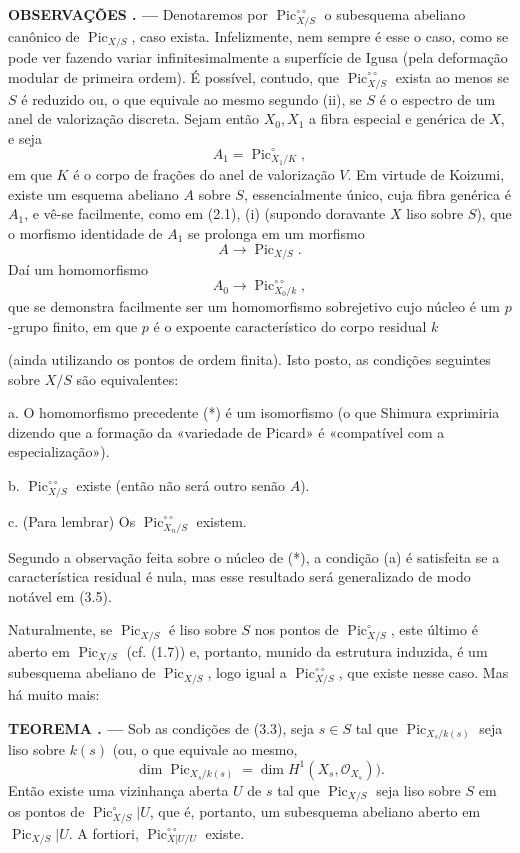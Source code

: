 \documentclass[11pt,twoside,openany]{book}
\numberwithin{equation}{section}
\newcommand{\src}[1]{%
  \phantomsection\hypertarget{src:#1}{}%
  \marginpar{\raggedleft\footnotesize\sffamily #1}%
}
\theoremstyle{plain}
\theoremstyle{definition}
\theoremstyle{remark}
\newcommand{\result}[2]{%
  \par\medskip\noindent\textbf{#1%
  \if\relax\detokenize{#2}\relax\else\space#2\fi. ---}\enspace
}
\newcommand{\FgaUnitKey}{frontmatter}
\renewcommand{\src}[1]{%
  \phantomsection\hypertarget{src:\FgaUnitKey:#1}{}%
  \marginpar{\raggedleft\footnotesize\sffamily #1}%
}
\begin{document}
\result{OBSERVAÇÕES}{3.4} Denotaremos por
$\operatorname{Pic}_{X/S}^{\circ\circ}$ o subesquema abeliano canônico de
$\operatorname{Pic}_{X/S}$, caso exista. Infelizmente, nem sempre é esse o
caso, como se pode ver fazendo variar infinitesimalmente a superfície de Igusa
(pela deformação modular de primeira ordem). É possível, contudo, que
$\operatorname{Pic}_{X/S}^{\circ\circ}$ exista ao menos se $S$ é reduzido ou,
o que equivale ao mesmo segundo (ii), se $S$ é o espectro de um anel de
valorização discreta. Sejam então $X_0,X_1$ a fibra especial e
genérica de $X$, e seja
\[
A_1=\operatorname{Pic}_{X_1/K}^\circ,
\]
em que $K$ é o corpo de frações do anel de valorização $V$. Em virtude de
Koizumi, existe um esquema abeliano $A$ sobre $S$, essencialmente único, cuja
fibra genérica é $A_1$, e vê-se facilmente, como em (2.1), (i) (supondo
doravante $X$ liso sobre $S$), que o morfismo identidade de $A_1$ se prolonga em um
morfismo
\[
A\longrightarrow\operatorname{Pic}_{X/S}.
\]
Daí um homomorfismo
\[
\tag{*}A_0\longrightarrow\operatorname{Pic}_{X_0/k}^{\circ\circ},
\]
que se demonstra facilmente ser um homomorfismo sobrejetivo cujo núcleo é um
$p$-grupo finito, em que $p$ é o expoente característico do corpo residual $k$
\src{239}
(ainda utilizando os pontos de ordem finita). Isto posto, as condições
seguintes sobre $X/S$ são equivalentes:

\medskip
\noindent a. O homomorfismo precedente (*) é um isomorfismo (o que Shimura
exprimiria dizendo que a formação da «variedade de Picard» é «compatível com a
especialização»).

\noindent b. $\operatorname{Pic}_{X/S}^{\circ\circ}$ existe (então não será
outro senão $A$).

\noindent c. (Para lembrar) Os
$\operatorname{Pic}_{X_n/S}^{\circ\circ}$ existem.

Segundo a observação feita sobre o núcleo de (*), a condição (a) é satisfeita
se a característica residual é nula, mas esse resultado será generalizado de
modo notável em (3.5).

Naturalmente, se $\operatorname{Pic}_{X/S}$ é liso sobre $S$ nos pontos de
$\operatorname{Pic}_{X/S}^\circ$, este último é
aberto em $\operatorname{Pic}_{X/S}$ (cf. (1.7)) e, portanto, munido da
estrutura induzida, é um subesquema abeliano de
$\operatorname{Pic}_{X/S}$, logo igual a
$\operatorname{Pic}_{X/S}^{\circ\circ}$, que existe nesse caso. Mas há muito
mais:

\result{TEOREMA}{3.5} Sob as condições de (3.3), seja $s\in S$ tal que
$\operatorname{Pic}_{X_s/k(s)}$ seja liso sobre $k(s)$ (ou, o que equivale ao
mesmo,
\[
\dim\operatorname{Pic}_{X_s/k(s)}=\dim H^1(X_s,\mathcal O_{X_s})).
\]
Então existe uma vizinhança aberta $U$ de $s$ tal que
$\operatorname{Pic}_{X/S}$ seja liso sobre $S$ em os pontos de
$\operatorname{Pic}_{X/S}^\circ|U$, que é, portanto, um subesquema abeliano aberto em
$\operatorname{Pic}_{X/S}|U$. A fortiori,
$\operatorname{Pic}_{X|U/U}^{\circ\circ}$ existe.
\end{document}
